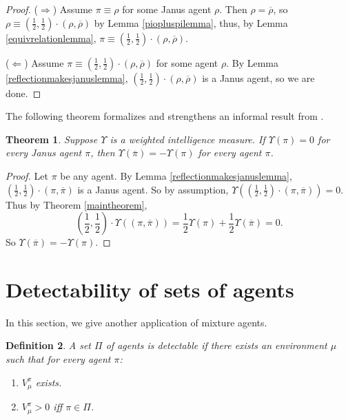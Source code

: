 \documentclass{article}
\newtheorem{theorem}{Theorem}
\newtheorem{definition}[theorem]{Definition}
\begin{document}
\begin{proof}
    ($\Rightarrow$)
    Assume $\pi\equiv\rho$ for some Janus agent $\rho$.
    Then $\rho=\overline{\rho}$, so
    $\rho\equiv (\frac12,\frac12)\cdot(\rho,\overline{\rho})$ by
    Lemma \ref{piopluspilemma}, thus, by Lemma \ref{equivrelationlemma},
    $\pi\equiv(\frac12,\frac12)\cdot(\rho,\overline{\rho})$.

    ($\Leftarrow$)
    Assume $\pi\equiv(\frac12,\frac12)\cdot(\rho,\overline{\rho})$ for some agent $\rho$.
    By Lemma \ref{reflectionmakesjanuslemma},
    $(\frac12,\frac12)\cdot(\rho,\overline{\rho})$ is a Janus agent, so we are done.
\end{proof}

The following theorem formalizes and strengthens an informal result
from \cite{alexander2021reward}.

\begin{theorem}
    Suppose $\Upsilon$ is a weighted intelligence measure.
    If $\Upsilon(\pi)=0$ for every Janus agent $\pi$,
    then $\Upsilon(\overline{\pi})=-\Upsilon(\pi)$
    for every agent $\pi$.
\end{theorem}

\begin{proof}
    Let $\pi$ be any agent.
    By Lemma \ref{reflectionmakesjanuslemma},
    $(\frac12,\frac12)\cdot(\pi,\overline\pi)$ is a Janus agent.
    So by assumption,
    $\Upsilon((\frac12,\frac12)\cdot(\pi,\overline\pi))=0$.
    Thus by Theorem \ref{maintheorem},
    \[
        (\mbox{$\frac12$},\mbox{$\frac12$})\cdot\Upsilon((\pi,\overline\pi))
        =\mbox{$\frac12$}\Upsilon(\pi)+\mbox{$\frac12$}\Upsilon(\overline\pi)=0.
    \]
    So $\Upsilon(\overline{\pi})=-\Upsilon(\pi)$.
\end{proof}


\section{Detectability of sets of agents}

In this section, we give another application of mixture agents.

\begin{definition}
\label{incentivizabilitydefn}
    A set $\Pi$ of agents is \emph{detectable} if there exists
    an environment $\mu$ such that for every agent $\pi$:
    \begin{enumerate}
        \item
        $V^\pi_\mu$ exists.
        \item
        $V^\pi_\mu>0$ iff $\pi\in\Pi$.
    \end{enumerate}
\end{definition}
\end{document}
